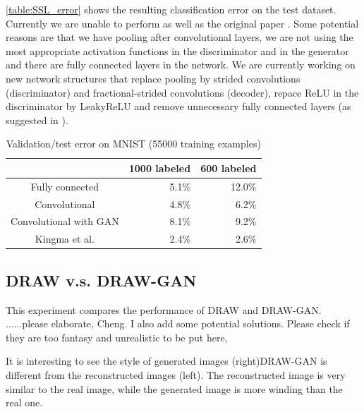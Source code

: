 \documentclass[10pt]{article}
\begin{document}
  \autoref{table:SSL_error} shows the resulting classification error on the test dataset. Currently we are unable to perform as well as the original paper \cite{DBLP:journals/corr/KingmaRMW14}. Some potential reasons are that we have pooling after convolutional layers, we are not using the most appropriate activation functions in the discriminator and in the generator and there are fully connected layers in the network. We are currently working on new network structures that replace pooling by strided convolutions (discriminator) and fractional-strided convolutions (decoder), repace ReLU in the discriminator by LeakyReLU and remove unnecessary fully connected layers (as suggested in \cite{alec2016dcgan}).

\begin{table}[!ht]
\centering
\begin{tabular}{c|r|r}
& 1000 labeled & 600 labeled\\ \hline
Fully connected &  5.1\% &  12.0\%\\
Convolutional &  4.8\% &  6.2\%\\
Convolutional with GAN &  8.1\% &  9.2\%\\
Kingma et al. \cite{DBLP:journals/corr/KingmaRMW14}
& 2.4\% & 2.6\%
\end{tabular}
\caption{Validation/test error on MNIST (55000 training examples)}
\label{table:SSL_error}
\end{table}




\subsection{DRAW v.s. DRAW-GAN}
This experiment compares the performance of DRAW and DRAW-GAN. ......please elaborate, Cheng. I also add some potential solutions. Please check if they are too fantasy and unrealistic to be put here,

It is interesting to see the style of generated images (right)DRAW-GAN is different from the reconstructed images (left). The reconstructed image is very similar to the real image, while the generated image is more winding than the real one.
\end{document}
